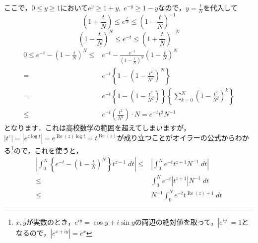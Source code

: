 \documentclass[./main]{subfile}
\begin{document}
ここで，$0\leq y\geq 1$において$e^{y}\geq 1+y,\;e^{-y}\geq 1-y$なので，$y=\frac{t}{N}$を代入して
\[
\left(1+\frac{t}{N}\right)\leq e^{\frac{t}{N}}\leq \left(1-\frac{t}{N}\right)^{-1}
\]
\[
\left(1-\frac{t}{N}\right)^N\leq e^{-t}\leq \left(1+\frac{t}{N}\right)^{-N}
\]
\begin{align*}
0\leq e^{-t}-\left(1-\frac{t}{N}\right)^N\leq&e^{-t}-\frac{e^{-t}}{\left(1-\frac{t}{N}\right)^N}\left(1-\frac{t}{N}\right)^N\\
=&e^{-t}\left\{1-\left(1-\frac{t^2}{N^2}\right)^N\right\}\\
=&e^{-t}\left\{1-\left(1-\frac{t^2}{N^2}\right)\right\}\left\{\sum_{k=0}^N\left(1-\frac{t^2}{N^2}\right)^k\right\}\\
\leq &e^{-t}\left(\frac{t^2}{N^2}\right)\cdot N=e^{-t}t^2N^{-1}
\end{align*}
となります．これは高校数学の範囲を超えてしまいますが，$|t^{z}|=|e^{z\log t}|=e^{\operatorname{Re}(z)\log t}=t^{\operatorname{Re}(z)}$が成り立つことがオイラーの公式からわかる\footnote{$x,y$が実数のとき，$e^{iy}=\cos y+i\sin y$の両辺の絶対値を取って，$|e^{iy}|=1$となるので，$|e^{x+iy}|=e^x$}ので，これを使うと，
\begin{align*}
\left|\int_0^N\left\{e^{-t}-\left(1-\frac{t}{N}\right)^N\right\}t^{z-1}\;dt\right|\leq&\left|\int_0^Ne^{-t}t^{z+1}N^{-1}\;dt\right|\\
\leq&\int_0^Ne^{-t}\left|t^{z+1}\right|N^{-1}\;dt\\
\leq&N^{-1}\int_0^Ne^{-t}t^{\operatorname{Re}(z)+1}\;dt
\end{align*}
\end{document}
